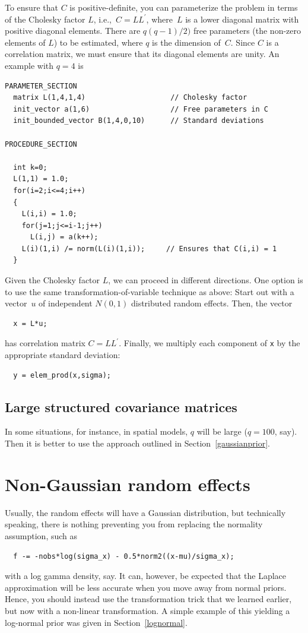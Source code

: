 \documentclass{admbmanual}
\begin{document}
To ensure that $C$ is positive-definite, you can parameterize the problem in terms of
the Cholesky factor $L$, i.e.,~$C=LL^\prime$, where~$L$ is a lower diagonal matrix with positive diagonal elements.
There are $q(q-1)/2)$ free parameters (the non-zero elements of $L$) to be estimated, where $q$ is the dimension of~$C$.
Since $C$ is a correlation matrix, we must ensure that its diagonal elements are unity. An example with $q=4$ is
\begin{lstlisting}
PARAMETER_SECTION
  matrix L(1,4,1,4)                    // Cholesky factor
  init_vector a(1,6)                   // Free parameters in C
  init_bounded_vector B(1,4,0,10)      // Standard deviations
  
PROCEDURE_SECTION

  int k=0;
  L(1,1) = 1.0;
  for(i=2;i<=4;i++)
  {
    L(i,i) = 1.0;
    for(j=1;j<=i-1;j++)
      L(i,j) = a(k++);
    L(i)(1,i) /= norm(L(i)(1,i));     // Ensures that C(i,i) = 1
  }
\end{lstlisting}
Given the Cholesky factor $L$, we can proceed in different directions. One option is to use the same 
transformation-of-variable technique as above: 
Start out with a vector~$u$ of independent $N(0,1)$ distributed random effects. Then, the vector
\begin{lstlisting}
  x = L*u;
\end{lstlisting}
has correlation matrix $C=LL^\prime$. Finally, we multiply each component of \texttt{x} by the 
appropriate standard deviation:
\begin{lstlisting}
  y = elem_prod(x,sigma);
\end{lstlisting}


\subsection{Large structured covariance matrices} 

In some situations, for instance, in spatial models, $q$ will be large ($q=100$, say). Then
it is better to use the approach outlined in Section~\ref{gaussianprior}.


\section{Non-Gaussian random effects}

Usually, the random effects will have a Gaussian distribution, but technically speaking, there is nothing
preventing you from replacing the normality assumption, such as
\begin{lstlisting}
  f -= -nobs*log(sigma_x) - 0.5*norm2((x-mu)/sigma_x);
\end{lstlisting}
with a log gamma density, say. It can, however, be expected that the
Laplace approximation will be less accurate when you move away from
 normal priors. Hence, you should instead use the transformation trick that
we learned earlier, but now with a non-linear transformation.
A simple example of this yielding a log-normal prior was given in Section~\ref{lognormal}.
\end{document}
